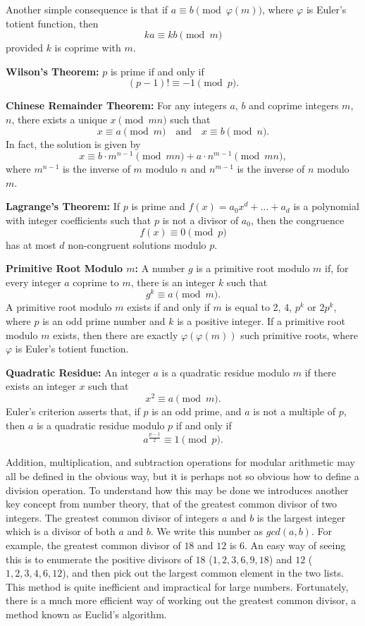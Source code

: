 Another simple consequence is that if \( a \equiv b \pmod{\varphi(m)} \), where \( \varphi \) is Euler's totient function, then
\[
ka \equiv kb \pmod{m}
\]
provided \( k \) is coprime with \( m \).

\textbf{Wilson's Theorem:} \( p \) is prime if and only if
\[
(p - 1)! \equiv -1 \pmod{p}.
\]

\textbf{Chinese Remainder Theorem:} For any integers \( a \), \( b \) and coprime integers \( m \), \( n \), there exists a unique \( x \pmod{mn} \) such that
\[
x \equiv a \pmod{m} \quad \text{and} \quad x \equiv b \pmod{n}.
\]
In fact, the solution is given by
\[
x \equiv b \cdot m^{n-1} \pmod{mn} + a \cdot n^{m-1} \pmod{mn},
\]
where \( m^{n-1} \) is the inverse of \( m \) modulo \( n \) and \( n^{m-1} \) is the inverse of \( n \) modulo \( m \).

\textbf{Lagrange's Theorem:} If \( p \) is prime and \( f(x) = a_0 x^d + \dots + a_d \) is a polynomial with integer coefficients such that \( p \) is not a divisor of \( a_0 \), then the congruence
\[
f(x) \equiv 0 \pmod{p}
\]
has at most \( d \) non-congruent solutions modulo \( p \).

\textbf{Primitive Root Modulo \( m \):} A number \( g \) is a primitive root modulo \( m \) if, for every integer \( a \) coprime to \( m \), there is an integer \( k \) such that
\[
g^k \equiv a \pmod{m}.
\]
A primitive root modulo \( m \) exists if and only if \( m \) is equal to 2, 4, \( p^k \) or \( 2p^k \), where \( p \) is an odd prime number and \( k \) is a positive integer. If a primitive root modulo \( m \) exists, then there are exactly \( \varphi(\varphi(m)) \) such primitive roots, where \( \varphi \) is Euler's totient function.

\textbf{Quadratic Residue:} An integer \( a \) is a quadratic residue modulo \( m \) if there exists an integer \( x \) such that
\[
x^2 \equiv a \pmod{m}.
\]
Euler's criterion asserts that, if \( p \) is an odd prime, and \( a \) is not a multiple of \( p \), then \( a \) is a quadratic residue modulo \( p \) if and only if
\[
a^{\frac{p-1}{2}} \equiv 1 \pmod{p}.
\]

Addition, multiplication, and subtraction operations for modular arithmetic may all be defined in the obvious way, but it is perhaps not so obvious how to define a division operation. To understand how this may be done we introduces another key concept from number theory, that of the greatest common divisor of two integers. The greatest common divisor of integers $a$ and $b$ is the largest integer which is a divisor of both $a$ and $b$. We write this number as $gcd(a,b)$. For example, the greatest common divisor of $18$ and $12$ is $6$. An easy way of seeing this is to enumerate the positive divisors of $18$ ($1,2,3,6,9,18$) and $12$ ($1,2,3,4,6,12$), and then pick out the largest common element in the two lists. This method is quite inefficient and impractical for large numbers. Fortunately, there is a much more efficient way of working out the greatest common divisor, a method known as Euclid's algorithm.

